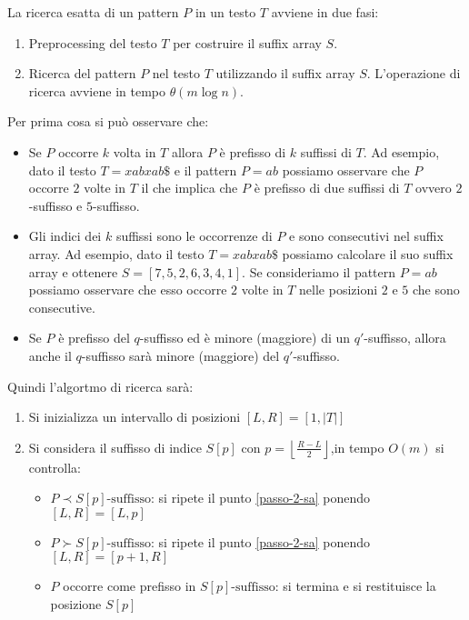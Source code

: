 La ricerca esatta di un pattern $P$ in un testo $T$ avviene in due fasi:
\begin{enumerate}
    \item Preprocessing del testo $T$ per costruire il suffix array $S$.
    \item Ricerca del pattern $P$ nel testo $T$ utilizzando il suffix array $S$.
          L'operazione di ricerca avviene in tempo $\theta(m \log n)$.
\end{enumerate}
Per prima cosa si può osservare che: %
\begin{itemize}
    \item Se $P$ occorre $k$ volta in $T$ allora $P$ è prefisso di $k$ suffissi di $T$.
          Ad esempio, dato il testo $T = xabxab\$$ e il pattern $P = ab$ possiamo
          osservare che $P$ occorre $2$ volte in $T$ il che implica che $P$ è
          prefisso di due suffissi di $T$ ovvero $2$-suffisso e $5$-suffisso.
    \item Gli indici dei $k$ suffissi sono le occorrenze di $P$ e sono consecutivi
          nel suffix array. Ad esempio, dato il testo $T = xabxab\$$ possiamo
          calcolare il suo suffix array e ottenere $S=[7, 5, 2, 6, 3, 4, 1]$. Se
          consideriamo il pattern $P = ab$ possiamo osservare che  esso occorre
          $2$ volte in $T$ nelle posizioni $2$ e $5$ che sono consecutive.
    \item Se $P$ è prefisso del $q$-suffisso ed è minore (maggiore) di un $q'$-suffisso,
          allora anche il $q$-suffisso sarà minore (maggiore) del $q'$-suffisso.
\end{itemize}
Quindi l'algortmo di ricerca sarà:
\begin{enumerate}
    \item Si inizializza un intervallo di posizioni $[L,R]=[1,|T|]$
    \item \label{passo-2-sa} Si considera il suffisso di indice $S[p]$ con
          $p=\left\lfloor\frac{R-L}{2}\right\rfloor$,in tempo $O(m)$ si controlla:
          \begin{itemize}
              \item $P\prec S[p]\text{-suffisso}$: si ripete il punto \ref{passo-2-sa}
                    ponendo $[L,R]=[L,p]$
              \item $P\succ S[p]\text{-suffisso}$: si ripete il punto \ref{passo-2-sa}
                    ponendo $[L,R]=[p+1,R]$
              \item $P$ occorre come prefisso in $S[p]\text{-suffisso}$: si termina e
                    si restituisce la posizione $S[p]$
          \end{itemize}
\end{enumerate}
